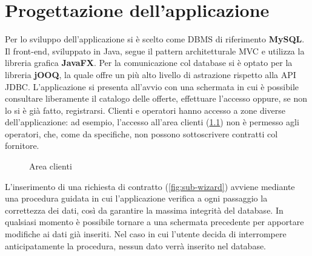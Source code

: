 \documentclass[a4paper,12pt]{report}
\begin{document}
\chapter{Progettazione dell'applicazione}
Per lo sviluppo dell'applicazione si è scelto come DBMS di riferimento \textbf{MySQL}. Il front-end, sviluppato in Java, segue il pattern architetturale MVC e utilizza la libreria grafica \textbf{JavaFX}. Per la comunicazione col database si è optato per la libreria \textbf{jOOQ}, la quale offre un più alto livello di astrazione rispetto alla API JDBC.
\newline
L'applicazione si presenta all'avvio con una schermata in cui è possibile consultare liberamente il catalogo delle offerte, effettuare l'accesso oppure, se non lo si è già fatto, registrarsi. Clienti e operatori hanno accesso a zone diverse dell'applicazione: ad esempio, l'accesso all'area clienti (\cref{fig:user-area}) non è permesso agli operatori, che, come da specifiche, non possono sottoscrivere contratti col fornitore.

\begin{figure}[H]
    \centering{}
    \caption{Area clienti}
    \label{fig:user-area}
\end{figure}

L'inserimento di una richiesta di contratto (\cref{fig:sub-wizard}) avviene mediante una procedura guidata in cui l'applicazione verifica a ogni passaggio la correttezza dei dati, così da garantire la massima integrità del database. In qualsiasi momento è possibile tornare a una schermata precedente per apportare modifiche ai dati già inseriti. Nel caso in cui l'utente decida di interrompere anticipatamente la procedura, nessun dato verrà inserito nel database.
\end{document}
